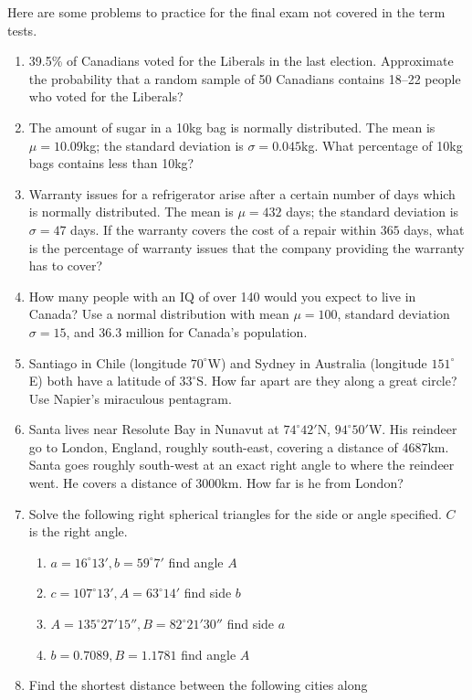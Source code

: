 \documentclass[11pt]{article}
\begin{document}
Here are some problems to practice for the final exam not covered in
the term tests.

\begin{enumerate}
\item 39.5\% of Canadians voted for the Liberals in the last election.
  Approximate the probability that a random sample of 50 Canadians
  contains 18--22 people who voted for the Liberals?
\item The amount of sugar in a 10kg bag is normally distributed. The
  mean is $\mu=10.09$kg; the standard deviation is $\sigma=0.045$kg.
  What percentage of 10kg bags contains less than 10kg?
\item Warranty issues for a refrigerator arise after a certain number
  of days which is normally distributed. The mean is $\mu=432$ days;
  the standard deviation is $\sigma=47$ days. If the warranty covers
  the cost of a repair within $365$ days, what is the percentage of
  warranty issues that the company providing the warranty has to
  cover?
\item How many people with an IQ of over 140 would you expect to live
  in Canada? Use a normal distribution with mean $\mu=100$, standard
  deviation $\sigma=15$, and 36.3 million for Canada's population.
\item Santiago in Chile (longitude $70^{\circ}$W) and Sydney in
  Australia (longitude $151^{\circ}$E) both have a latitude of
  $33^{\circ}$S. How far apart are they along a great circle? Use
  Napier's miraculous pentagram.
\item Santa lives near Resolute Bay in Nunavut at $74^{\circ}42'$N,
  $94^{\circ}50'$W. His reindeer go to London, England, roughly
  south-east, covering a distance of 4687km. Santa goes roughly
  south-west at an exact right angle to where the reindeer went. He
  covers a distance of 3000km. How far is he from London?
\item Solve the following right spherical triangles for the side or
  angle specified. $C$ is the right angle.
  \begin{enumerate}
  \item $a=16^{\circ}13',b=59^{\circ}7'$ find angle $A$
  \item $c=107^{\circ}13',A=63^{\circ}14'$ find side $b$
  \item $A=135^{\circ}27'15'',B=82^{\circ}21'30''$ find side $a$
  \item $b=0.7089,B=1.1781$ find angle $A$
  \end{enumerate}
\item Find the shortest distance between the following cities along

\end{enumerate}
\end{document}

